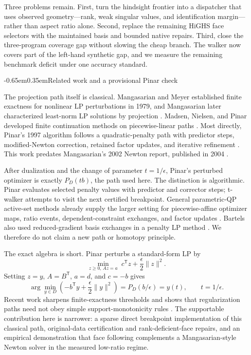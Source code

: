 \documentclass[10pt,letterpaper]{article}
\makeatletter
\renewcommand\section{\@startsection{section}{1}{0pt}%
  {-0.65em}{0.35em}{\normalfont\Large\bfseries}}
\makeatother
\begin{document}
Three problems remain. First, turn the hindsight frontier into a dispatcher that uses observed geometry---rank, weak singular values, and identification margin---rather than aspect ratio alone. Second, replace the remaining HiGHS face selectors with the maintained basis and bounded native repairs. Third, close the three-program coverage gap without slowing the cheap branch. The walker now covers part of the left-hand synthetic gap, and we measure the remaining benchmark deficit under one accuracy standard.

\clearpage
\section{Related work and a provisional Pinar check}

The projection path itself is classical. Mangasarian and Meyer established finite exactness for nonlinear LP perturbations in 1979, and Mangasarian later characterized least-norm LP solutions by projection \citep{mangasarian-meyer-1979,mangasarian-1984}. Madsen, Nielsen, and Pinar developed finite continuation methods on piecewise-linear paths \citep{madsen-nielsen-pinar-1996,pinar-1996}. Most directly, Pinar's 1997 algorithm follows a quadratic-penalty path with predictor steps, modified-Newton correction, retained factor updates, and iterative refinement \citep{pinar-1997}. This work predates Mangasarian's 2002 Newton report, published in 2004 \citep{mangasarian-2004,kline-fung-2023}.

After dualization and the change of parameter $t=1/\epsilon$, Pinar's perturbed optimizer is exactly $P_D(tb)$, the path used here. The distinction is algorithmic. Pinar evaluates selected penalty values with predictor and corrector steps; t-walker attempts to visit the next certified breakpoint. General parametric-QP active-set methods already supply the larger setting for piecewise-affine optimizer maps, ratio events, dependent-constraint exchanges, and factor updates \citep{best-1996,bock-kirches-potschka-schloeder-2010,ferreau-etal-2014}. Bartels also used reduced-gradient basis exchanges in a penalty LP method \citep{bartels-1980}. We therefore do not claim a new path or homotopy principle.

The exact algebra is short. Pinar perturbs a standard-form LP by
\[
 \min_{z\ge0,\,Az=a}\; c^\mathsf{T}z+\frac{\epsilon}{2}\lVert z\rVert^2.
\]
Setting $z=y$, $A=B^\mathsf{T}$, $a=d$, and $c=-b$ gives
\[
 \arg\min_{y\in D}\left(-b^\mathsf{T}y+\frac{\epsilon}{2}\lVert y\rVert^2\right)
 =P_D(b/\epsilon)=y(t), \qquad t=1/\epsilon.
\]
Recent work sharpens finite-exactness thresholds and shows that regularization paths need not obey simple support-monotonicity rules \citep{gonzalez-sanz-nutz-2025,gonzalez-sanz-nutz-riveros-2025}. The supportable contribution here is narrower: a sparse direct breakpoint implementation of this classical path, original-data certification and rank-deficient-face repairs, and an empirical demonstration that face following complements a Mangasarian-style Newton solver in the measured low-ratio regime.
\end{document}
